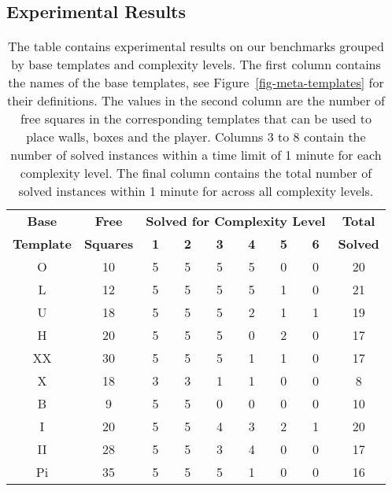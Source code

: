 \documentclass[runningheads]{llncs}
\begin{document}
\subsection{Experimental Results}
\begin{table}[t]
\setlength{\tabcolsep}{11pt}
\renewcommand{\arraystretch}{1.25}
\centering
\begin{tabular}{|c|c||c c c c c c|c|}
\hline
\textbf{\textbf{Base}} & \textbf{\textbf{Free}} & \multicolumn{6}{c|}{\textbf{Solved for Complexity Level}} & \textbf{Total} \\ 
\textbf{Template} & \textbf{Squares} & \textbf{1} & \textbf{2} & \textbf{3} & \textbf{4} & \textbf{5} & \textbf{6} & \textbf{Solved} \\ 
\hline 
\rowcolor{mygray} 
O  & 10 &   5 &  5 &  5  & 5 &  0 &  0 & 20 \\
L  & 12 &   5 &  5 &  5  & 5 &  1 &  0 & 21 \\
\rowcolor{mygray} 
U  & 18 &   5 &  5 &  5  & 2 &  1 &  1 & 19 \\
H  & 20 &   5 &  5 &  5  & 0 &  2 &  0 & 17 \\
\rowcolor{mygray} 
XX & 30 &   5 &  5 &  5  & 1 &  1 &  0 & 17 \\
X  & 18 &   3 &  3 &  1  & 1 &  0 &  0 & 8  \\
\rowcolor{mygray} 
B  & 9  &   5 &  5 &  0  & 0 &  0 &  0 & 10 \\
I  & 20 &   5 &  5 &  4  & 3 &  2 &  1 & 20 \\
\rowcolor{mygray} 
II & 28 &   5 &  5 &  3  & 4 &  0 &  0 & 17 \\
Pi & 35 &   5 &  5 &  5  & 1 &  0 &  0 & 16 \\
\hline 
\end{tabular} 
\vspace{1em}
\caption{The table contains experimental results on our benchmarks grouped by base templates and complexity
levels. The first column contains the names of the base templates, see Figure~\ref{fig-meta-templates} for
their definitions. The values in the second column are the number of free squares in the corresponding templates
that can be used to place walls, boxes and the player.
Columns 3 to 8 contain the number of solved instances within a time limit of 1 minute for each complexity level.
The final column contains the total number of solved instances within 1 minute for across all complexity
levels.}
\label{tab-results}
\end{table}
\end{document}
